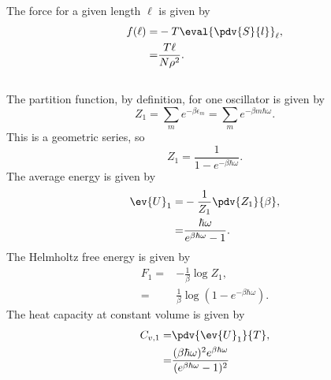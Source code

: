 \documentclass[a4paper,12pt,twoside]{article}
\begin{document}
\begin{multicols*}{2}
\subsubsection{}
The force for a given length $\ell$ is given by
\begin{align}
	f(\ell) =& -T\eval{\pdv{S}{l}}_\ell,\\
	=& \frac{T\ell}{N\rho^2}.
\end{align}

\subsection{}
\subsubsection{}
The partition function, by definition, for one oscillator is given by
\begin{equation}
	Z_1 = \sum_m e^{-\beta \epsilon_m} = \sum_m e^{-\beta m\hbar \omega}.
\end{equation}
This is a geometric series, so
\begin{equation}
	Z_1 = \frac{1}{1-e^{-\beta \hbar \omega}}.
\end{equation}
The average energy is given by
\begin{align}
	\ev{U}_1 =& -\frac{1}{Z_1}\pdv{Z_1}{\beta},\\
	=& \frac{\hbar\omega}{e^{\beta\hbar\omega}-1}.
\end{align}
The Helmholtz free energy is given by
\begin{align}
	F_1 =& - \frac{1}{\beta}\log Z_1,\\
	=& \frac{1}{\beta} \log(1-e^{-\beta\hbar\omega}).
\end{align}
The heat capacity at constant volume is given by
\begin{align}
	C_{v,1} =& \pdv{\ev{U}_1}{T},\\
	=& \frac{(\beta\hbar\omega)^2 e^{\beta\hbar\omega}}{(e^{\beta\hbar\omega}-1)^2}
\end{align}


\end{multicols*}
\end{document}
